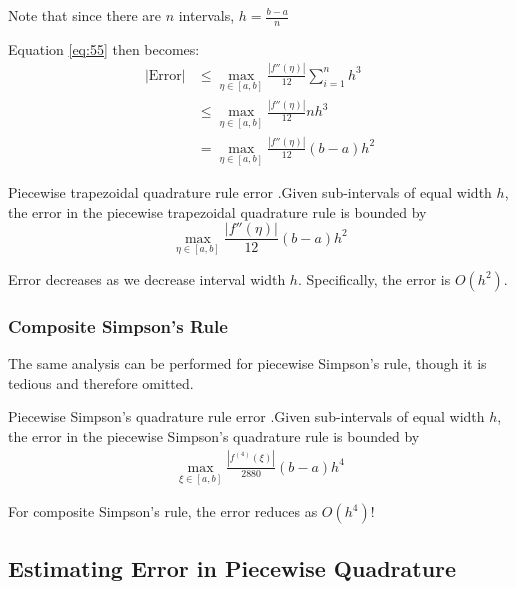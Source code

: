 \documentclass[12pt,letterpaper]{article}
\begin{document}
Note that since there are $n$ intervals, $h = \frac{b-a}{n}$

Equation \ref{eq:55} then becomes:
\begin{align}
	\big| \text{Error} \big| &\leq \max_{\eta \in [a,b]} \frac{\left| f''(\eta) \right|}{12} \sum_{i=1}^n h^3 \\
	&\leq \max_{\eta \in [a,b]} \frac{\left| f''(\eta) \right|}{12} n h^3 \\
	&= \max_{\eta \in [a,b]} \frac{\left| f''(\eta) \right|}{12} (b-a) h^2
\end{align}

\begin{theo}{Piecewise trapezoidal quadrature rule error}
.Given sub-intervals of equal width $h$, the error in the piecewise trapezoidal quadrature rule is bounded by
\begin{equation}
	\max_{\eta \in [a,b]} \frac{\left| f''(\eta) \right|}{12} (b-a) h^2
\end{equation}
\label{thm:piecewise_trap_error}
\end{theo}

Error decreases as we decrease interval width $h$. Specifically, the error is $O(h^2)$.

\subsubsection{Composite Simpson's Rule}

The same analysis can be performed for piecewise Simpson's rule, though it is tedious and therefore omitted.

\begin{theo}{Piecewise Simpson's quadrature rule error}
.Given sub-intervals of equal width $h$, the error in the piecewise Simpson's quadrature rule is bounded by
\begin{align}
	\max_{\xi \in [a,b]} \frac{\left| f^{(4)}(\xi) \right|}{2880} (b-a) h^4
\end{align}
\label{thm:piecwise_simpson_error}
\end{theo}

For composite Simpson's rule, the error reduces as $O(h^4)$!

\subsection{Estimating Error in  Piecewise Quadrature}
\end{document}
